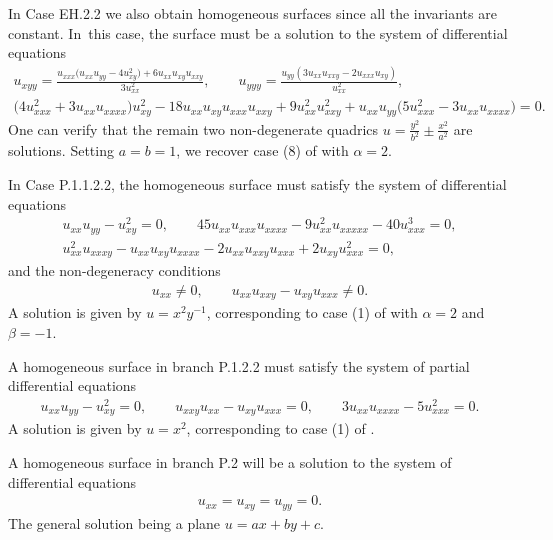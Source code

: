 \documentclass[10pt,a4paper]{amsart}
\numberwithin{equation}{section}
\begin{document}
\begin{Example}
In Case EH.2.2 we also obtain homogeneous surfaces since all the invariants are constant. In~this case, the surface must be a solution to the system of differential equations
\begin{gather*}
u_ {xyy}=\frac{u_{xxx} \big(u_{xx} u_{yy}-4 u_ {xy}^2\big)+6 u_{xx} u_{xy}u_{xxy}}{3 u_ {xx}^2},\qquad
u_ {yyy}=\frac{u_{yy} (3 u_{xx} u_{xxy}-2u_{xxx} u_{xy})}{u_ {xx}^2},\\
%
\big(4 u_{xxx}^2\!+3 u_{xx} u_{xxxx}\big) u_{xy}^2\!-18 u_{xx}u_{xy} u_{xxx}u_{xxy} \!+9 u_{xx}^2 u_{xxy}^2\!+u_{xx}u_{yy}\big(5 u_{xxx}^2\!-3 u_{xx}u_{xxxx}\big) = 0.
\end{gather*}
%
One can verify that the remain two non-degenerate quadrics $u=\frac{y^2}{b^2}\pm \frac{x^2}{a^2}$ are solutions. Setting $a=b=1$, we recover case (8) of \cite[Theorem 1]{DKR-1996} with $\alpha=2$.
\end{Example}

\begin{Example}
In Case P.1.1.2.2, the homogeneous surface must satisfy the system of differential equations
\begin{gather*}
u_{xx} u_{yy} - u_{xy}^2 =0,\qquad
45u_{xx} u_{xxx} u_{xxxx} - 9 u_{xx}^2 u_{xxxxx} -40 u_{xxx}^3=0,\\
u_{xx}^2 u_{xxxy}-u_{xx}u_{xy}u_{xxxx}-2u_{xx}u_{xxy} u_{xxx}+2u_{xy}u_{xxx}^2=0,
\end{gather*}
and the non-degeneracy conditions
\begin{gather*}
u_{xx}\neq 0,\qquad u_{xx}u_{xxy}-u_{xy}u_{xxx}\neq 0.
\end{gather*}
A solution is given by $u=x^2 y^{-1}$, corresponding to case (1) of \cite[Theorem 1]{DKR-1996} with $\alpha=2$ and~$\beta=-1$.
\end{Example}

\begin{Example}
A homogeneous surface in branch P.1.2.2 must satisfy the system of partial differential equations
\begin{gather*}
u_{xx}u_{yy}-u_{xy}^2=0,\qquad u_{xxy}u_{xx}-u_{xy}u_{xxx}=0,\qquad 3u_{xx}u_{xxxx}-5u_{xxx}^2=0.
\end{gather*}
A solution is given by $u=x^2$, corresponding to case (1) of \cite[Theorem 1]{DKR-1996}.
\end{Example}

\begin{Example}
A homogeneous surface in branch P.2 will be a solution to the system of dif\-fe\-ren\-tial equations
\begin{gather*}
u_{xx}=u_{xy}=u_{yy}=0.
\end{gather*}
The general solution being a plane $u=ax+by+c$.
\end{Example}
\end{document}
